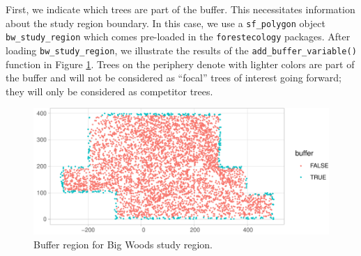 \documentclass[12pt]{article}
\newenvironment{Shaded}{\begin{snugshade}}{\end{snugshade}}
\newcommand{\DataTypeTok}[1]{\textcolor[rgb]{0.13,0.29,0.53}{#1}}
\newcommand{\FloatTok}[1]{\textcolor[rgb]{0.00,0.00,0.81}{#1}}
\newcommand{\KeywordTok}[1]{\textcolor[rgb]{0.13,0.29,0.53}{\textbf{#1}}}
\newcommand{\NormalTok}[1]{#1}
\newcommand{\OperatorTok}[1]{\textcolor[rgb]{0.81,0.36,0.00}{\textbf{#1}}}
\newcommand{\StringTok}[1]{\textcolor[rgb]{0.31,0.60,0.02}{#1}}
\begin{document}
First, we indicate which trees are part of the buffer. This necessitates
information about the study region boundary. In this case, we use a
\texttt{sf\_polygon} object \texttt{bw\_study\_region} which comes
pre-loaded in the \texttt{forestecology} packages. After loading
\texttt{bw\_study\_region}, we illustrate the results of the
\texttt{add\_buffer\_variable()} function in Figure
\ref{fig:bw-define-buffer}. Trees on the periphery denote with lighter
colors are part of the buffer and will not be considered as ``focal''
trees of interest going forward; they will only be considered as
competitor trees.

\begin{Shaded}
\end{Shaded}

\begin{figure}

{\centering \includegraphics[width=1\linewidth]{Figures/bw-define-buffer-1} 

}

\caption{Buffer region for Big Woods study region.}\label{fig:bw-define-buffer}
\end{figure}
\end{document}
